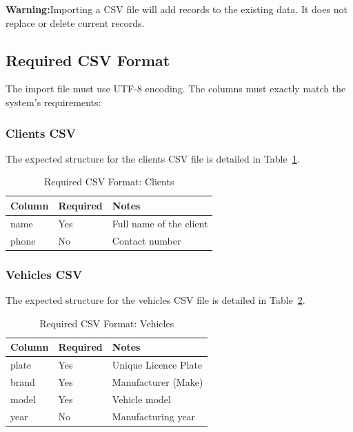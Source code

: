 \documentclass[12pt, a4paper]{report}
\newcommand{\warnbox}[1]{%
	\vspace{6pt}
	\noindent
	\colorbox{WarnYellow}{%
		\begin{minipage}{\dimexpr\linewidth-2\fboxsep}%
			\vspace{5pt}
			\small\textbf{\color{WarnBorder}Warning:\space}\color{Navy}#1
			\vspace{5pt}
		\end{minipage}%
	}
	\vspace{6pt}
}
\begin{document}
	\warnbox{Importing a CSV file will add records to the existing data.
		It does not replace or delete current records.}
	
	\subsection{Required CSV Format}
	
	The import file must use UTF-8 encoding. The columns must exactly match the system's requirements:
	
	\subsubsection*{Clients CSV}
	
	The expected structure for the clients CSV file is detailed in Table~\ref{tab:csv_clients}.

	\begin{table}[H]
		\centering
		\caption{Required CSV Format: Clients}
		\label{tab:csv_clients}
		\begin{tabularx}{\textwidth}{l l X}
			\toprule
			\textbf{Column} & \textbf{Required} & \textbf{Notes} \\
			\midrule
			name   & Yes & Full name of the client \\
			phone  & No  & Contact number \\
			\bottomrule
		\end{tabularx}
	\end{table}
	
	\vspace{10pt}
	\subsubsection*{Vehicles CSV}
	
	The expected structure for the vehicles CSV file is detailed in Table~\ref{tab:csv_vehicles}.

	\begin{table}[H]
		\centering
		\caption{Required CSV Format: Vehicles}
		\label{tab:csv_vehicles}
		\begin{tabularx}{\textwidth}{l l X}
			\toprule
			\textbf{Column} & \textbf{Required} & \textbf{Notes} \\
			\midrule
			plate  & Yes & Unique Licence Plate \\
			brand  & Yes & Manufacturer (Make) \\
			model  & Yes & Vehicle model \\
			year   & No  & Manufacturing year \\
			\bottomrule
		\end{tabularx}
	\end{table}
	
\end{document}
